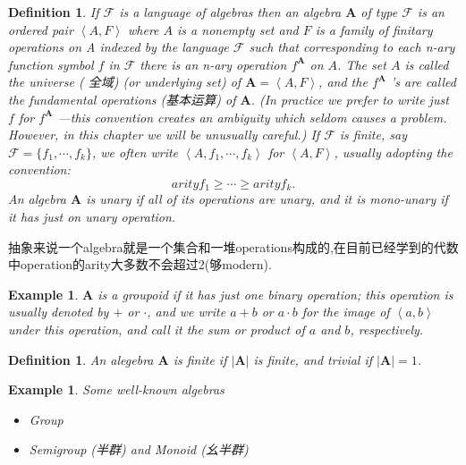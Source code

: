 \documentclass{article}
\newtheorem{example}[theorem]{Example}
\newtheorem{definition}[theorem]{Definition}
\begin{document}
\begin{definition}
\rm If $\mathcal{F}$ is a language of algebras then an {\color{red} algebra} $\mathbf{A}$ of type $\mathcal{F}$ is an ordered pair $\left<A,F\right>$ where $A$ is a nonempty set and $F$ is a family of finitary operations on A indexed by the language $\mathcal{F}$ such that corresponding to each n-ary function symbol $f$ in $\mathcal{F}$ there is an n-ary operation $f^\mathbf{A}$ on $A$. The set $A$ is called the {\color{red} universe} ({\color{blue} 全域}) (or underlying set) of $\mathbf{A} =\left<A,F\right>$, and the $f^\mathbf{A}$ ’s are called the {\color{red} fundamental operations} ({\color{blue}基本运算}) of $\mathbf{A}$. (In practice we prefer to write just $f$ for $f ^\mathbf{A}$ —this convention creates an ambiguity which seldom causes a problem. However, in this chapter we will be unusually careful.) If $\mathcal{F}$ is finite, say $\mathcal{F} = \{f_1,\cdots,f_k\}$, we often write $\left<A, f_1,\cdots,f_k\right>$ for $\left<A,F\right>$, usually adopting the convention:
$$
arity f_1 \geq \cdots \geq arity f_k.
$$
An algebra $\mathbf{A}$ is {\color{red} unary} if all of its operations are unary, and it is mono-unary if it has just on unary operation.
\end{definition}

{\color{blue} 抽象来说一个algebra就是一个集合和一堆operations构成的,在目前已经学到的代数中operation的arity大多数不会超过2(够modern).}

\begin{example}
\rm $\mathbf{A}$ is a {\color{red} groupoid} if it has just one binary operation; this operation is usually denoted by $+$ or $\cdot$, and we write $a+b$ or $a \cdot b$ for the image of $\left<a,b\right>$ under this operation, and call it the sum or product of $a$ and $b$, respectively.
\end{example}

\begin{definition}
\rm An alegebra $\mathbf{A}$ is {\color{red} finite} if $|\mathbf{A}|$ is finite, and trivial if $|\mathbf{A}|=1$. 
\end{definition}

\begin{example}
\rm Some well-known algebras
\begin{itemize}
	\item Group
	\item Semigroup (半群) and Monoid (幺半群)
\end{itemize}
\end{example}
\end{document}
